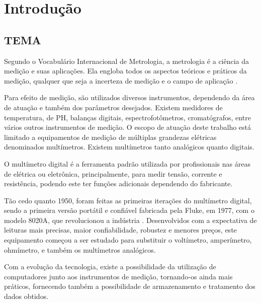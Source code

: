 
\chapter{Introdução}\label{cap:introducao}

\section{TEMA}\label{sec:tema}
Segundo o Vocabulário Internacional de Metrologia, a metrologia é a ciência da medição e suas aplicações. Ela engloba todos os aspectos teóricos e práticos da medição, qualquer que seja a incerteza de medição e o campo de aplicação \cite{linck}.

Para efeito de medição, são utilizados diversos instrumentos, dependendo da área de atuação e também dos parâmetros desejados. Existem medidores de temperatura, de PH, balanças digitais, espectrofotômetros, cromatógrafos, entre vários outros instrumentos de medição. O escopo de atuação deste trabalho está limitado a equipamentos de medição de múltiplas grandezas elétricas denominados multímetros. Existem multímetros tanto analógicos quanto digitais.

O multímetro digital é a ferramenta padrão utilizada por profissionais nas áreas de elétrica ou eletrônica, principalmente, para medir tensão, corrente e resistência, podendo este ter funções adicionais dependendo do fabricante.

Tão cedo quanto 1950, foram feitas as primeiras iterações do multímetro digital, sendo a primeira versão portátil e confiável fabricada pela Fluke, em 1977, com o modelo 8020A, que revolucionou a indústria \cite{DMMHistory}. Desenvolvidos com a expectativa de leituras mais precisas, maior confiabilidade, robustez e menores preços, este equipamento começou a ser estudado para substituir o voltímetro, amperímetro, ohmímetro, e também os multímetros analógicos. 

Com a evolução da tecnologia, existe a possibilidade da utilização de computadores junto aos instrumentos de medição, tornando-os ainda mais práticos, fornecendo também a possibilidade de armazenamento e tratamento dos dados obtidos.

